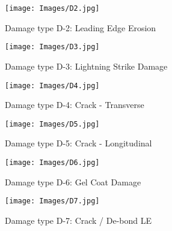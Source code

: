 \begin{figure*}[htbp]
        \centering
        \begin{subfigure}[b]{0.48\textwidth}
            \centering
            \texttt{[image: Images/D2.jpg]}
            \caption[Damage type D-2: Leading Edge Erosion]%
            {{\small Damage type D-2: Leading Edge Erosion}}    
            \label{fig:D2}
        \end{subfigure}
        \hfill
        \begin{subfigure}[b]{0.48\textwidth}
            \centering
            \texttt{[image: Images/D3.jpg]}
            \caption[Damage type D-3: Lightning Strike Damage]%
            {{\small Damage type D-3: Lightning Strike Damage}}    
            \label{fig:D3}
        \end{subfigure}
        \hfill
        \begin{subfigure}[b]{0.48\textwidth}
            \centering
            \texttt{[image: Images/D4.jpg]}
            \caption[Damage type D-4: Crack - Transverse]%
            {{\small Damage type D-4: Crack - Transverse}}    
            \label{fig:D4}
        \end{subfigure}
        \hfill
        \begin{subfigure}[b]{0.48\textwidth}
            \centering
            \texttt{[image: Images/D5.jpg]}
            \caption[Damage type D-5: Crack - Longitudinal]%
            {{\small Damage type D-5: Crack - Longitudinal}}    
            \label{fig:D5}
        \end{subfigure}
        \hfill
        \begin{subfigure}[b]{0.48\textwidth}
            \centering
            \texttt{[image: Images/D6.jpg]}
            \caption[Damage type D-6: Gel Coat Damage]%
            {{\small Damage type D-6: Gel Coat Damage}}    
            \label{fig:D6}
        \end{subfigure}
        \hfill
        \begin{subfigure}[b]{0.48\textwidth}
            \centering
            \texttt{[image: Images/D7.jpg]}
            \caption[Damage type D-7: Crack / De-bond LE]%
            {{\small Damage type D-7: Crack / De-bond LE}}    
            \label{fig:D7}
        \end{subfigure}
         \end{figure*}
         
